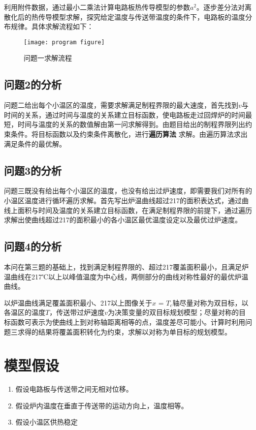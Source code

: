 \documentclass[withoutpreface,bwprint]{cumcmthesis} %
\numberwithin{equation}{subsection}
\begin{document}
利用附件数据，通过最小二乘法计算电路板热传导模型的参数$a^2$。逐步差分法对离散化后的热传导模型求解，探究给定温度与传送带温度的条件下，电路板的温度分布规律。具体求解流程如下：




\begin{figure}[!h]
    \centering
    \texttt{[image: program figure]}
    \caption{问题一求解流程}
    \label{fig:program_figure}
\end{figure}


\subsection{问题2的分析}
问题二给出每个小温区的温度，需要求解满足制程界限的最大速度，首先找到$v$与时间的关系，通过时间与温度的关系建立目标函数，使电路板走过回焊炉的时间最短，时间与温度的关系的数值解由第一问求解得到。由题目给出的制程界限列出约束条件。将目标函数以及约束条件离散化，进行\textbf{遍历算法} 求解。由遍历算法求出满足条件的最优解。

\subsection{问题3的分析}
问题三既没有给出每个小温区的温度，也没有给出过炉速度，即需要我们对所有的小温区温度进行循环遍历求解。首先写出炉温曲线超过217\textcelsius 的面积表达式，通过曲线上面积与时间及温度的关系建立目标函数，在满足制程界限的前提下，通过遍历求解出使曲线超过217\textcelsius 的面积最小的各小温区最优温度设定以及最优过炉速度。

\subsection{问题4的分析}
本问在第三题的基础上，找到满足制程界限的、超过217\textcelsius 覆盖面积最小，且满足炉温曲线在217℃以上以峰值温度为中心线，两侧部分的曲线对称性最好的最优炉温曲线。

以炉温曲线满足覆盖面积最小、217\textcelsius 以上图像关于$x$ = $T_{c}$轴尽量对称为双目标，以各温区的温度$T$，传送带过炉速度$v$为决策变量的双目标规划模型；尽量对称的目标函数可表示为使曲线上到对称轴距离相等的点，温度差尽可能小。计算时利用问题三求得的结果将覆盖面积转化为约束，求解以对称为单目标的规划模型。
\section{模型假设}

\begin{enumerate}[label=(\arabic*)]
	\item
	假设电路板与传送带之间无相对位移。
	\item
	假设炉内温度在垂直于传送带的运动方向上，温度相等。
	\item
	假设小温区供热稳定

	
\end{enumerate}
\end{document}
